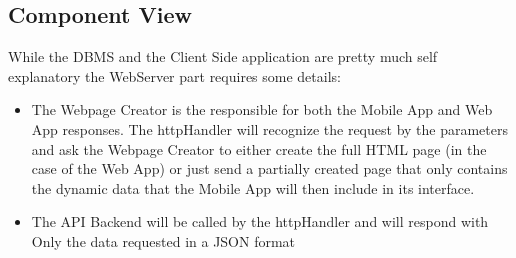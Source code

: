 \documentclass{article}
\begin{document}
\subsection{Component View}
\begin{figure}[H]
\end{figure}
	  While the DBMS and the Client Side application are pretty much self explanatory the WebServer part requires some details:
	  \begin{itemize}
			  \item The Webpage Creator is the responsible for both the Mobile App and Web App responses. The httpHandler will recognize the request by the parameters and ask the Webpage Creator to either create the full HTML page (in the case of the Web App) or just send a partially created page that only contains the dynamic data that the Mobile App will then include in its interface.
			  \item The API Backend will be called by the httpHandler and will respond with Only the data requested in a JSON format
	  \end{itemize}
\end{document}
